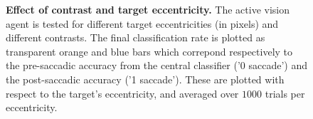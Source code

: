 \begin{figure}[t!]%
	\caption{
		{\bf Effect of contrast and target eccentricity.} %
		The active vision agent is tested for different target eccentricities (in pixels) and different contrasts. The final classification rate is plotted as transparent orange and blue bars which correpond respectively to the pre-saccadic accuracy from the central classifier ('0 saccade') and the post-saccadic accuracy ('1 saccade'). These are plotted with respect to the target's eccentricity, and averaged over $1000$ trials per eccentricity. %
		\label{fig:results}}%
\end{figure}%
